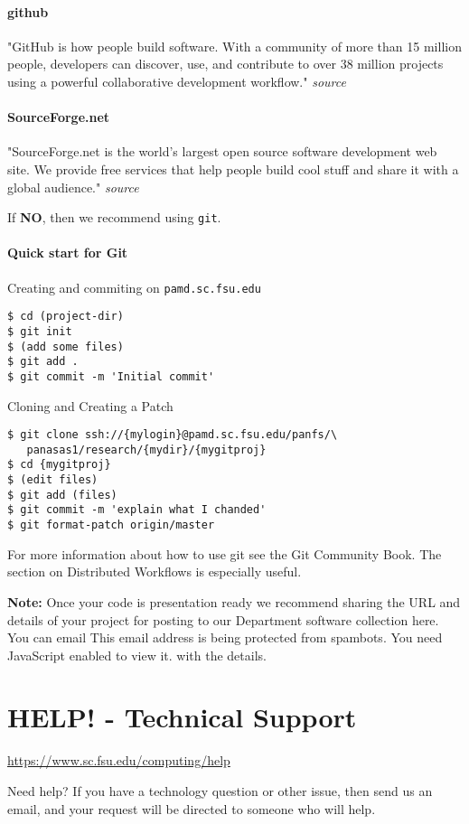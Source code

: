 \documentclass[12pt,a4paper]{article}
\begin{document}
\paragraph{github}
"GitHub is how people build software. With a community of more than 15 million people, developers can discover, use, and contribute to over 38 million projects using a powerful collaborative development workflow." \textit{source}
\paragraph{SourceForge.net}
"SourceForge.net is the world's largest open source software development web site. We provide free services that help people build cool stuff and share it with a global audience." \textit{source}

If \textbf{NO}, then we recommend using \texttt{git}.

\paragraph{Quick start for Git}
Creating and commiting on \texttt{pamd.sc.fsu.edu}
\begin{verbatim}
$ cd (project-dir)
$ git init
$ (add some files)
$ git add .
$ git commit -m 'Initial commit'
\end{verbatim}
Cloning and Creating a Patch
\begin{verbatim}
$ git clone ssh://{mylogin}@pamd.sc.fsu.edu/panfs/\
   panasas1/research/{mydir}/{mygitproj}
$ cd {mygitproj}
$ (edit files)
$ git add (files)
$ git commit -m 'explain what I chanded'
$ git format-patch origin/master
\end{verbatim}
For more information about how to use git see the Git Community Book. The section on Distributed Workflows is especially useful.

\textbf{Note:} Once your code is presentation ready we recommend sharing the URL and details of your project for posting to our Department software collection here. You can email This email address is being protected from spambots. You need JavaScript enabled to view it. with the details.

\section{HELP! - Technical Support}
\url{https://www.sc.fsu.edu/computing/help}

Need help? If you have a technology question or other issue, then send us an email, and your request will be directed to someone who will help.
\end{document}
